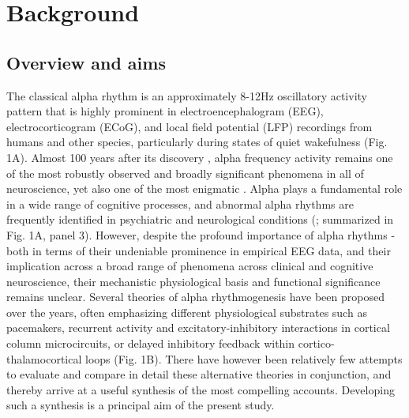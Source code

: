 \documentclass[12pt,twoside]{article}
\begin{document}
\newpage
\section{Background}
\subsection{Overview and aims}
The classical alpha rhythm is an approximately 8-12Hz oscillatory activity pattern that is highly prominent in electroencephalogram (EEG), electrocorticogram (ECoG), and local field potential (LFP) recordings from humans and other species, particularly during states of quiet wakefulness (Fig. 1A). Almost 100 years after its discovery \citep{berger1929elektroenkephalogramm}, alpha frequency activity remains one of the most robustly observed and broadly significant phenomena in all of neuroscience, yet also one of the most enigmatic \citep{bollimunta2011neuronal}. Alpha plays a fundamental role in a wide range of cognitive processes, and abnormal alpha rhythms are frequently identified in psychiatric and neurological conditions (\citealp{bucci2004executive, clancy2017restless,deiber2020linking,jensen2010shaping}; summarized in Fig. 1A, panel 3). However, despite the profound importance of alpha rhythms - both in terms of their undeniable prominence in empirical EEG data, and their implication across a broad range of phenomena across clinical and cognitive neuroscience, their mechanistic physiological basis and functional significance remains unclear. Several theories of alpha rhythmogenesis have been proposed over the years, often emphasizing different physiological substrates such as pacemakers, recurrent activity and excitatory-inhibitory interactions in cortical column microcircuits, or delayed inhibitory feedback within cortico-thalamocortical loops (Fig. 1B). There have however been relatively few attempts to evaluate and compare in detail these alternative theories in conjunction, and thereby arrive at a useful synthesis of the most compelling accounts. Developing such a synthesis is a principal aim of the present study. 
\end{document}
